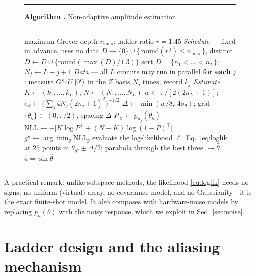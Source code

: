 \documentclass[%
 twocolumn,
 amsmath,amssymb,
prx,
longbibliography
]{revtex4-2}
\newcounter{algcnt}
\begin{document}
\begin{figure}[t]
\label{alg:method}
\vspace{2pt}\hrule\vspace{3pt}
\noindent\textbf{Algorithm \thealgcnt.} Non-adaptive amplitude estimation.
\vspace{3pt}\hrule\vspace{4pt}
\begin{algorithmic}[1]
\Require maximum Grover depth $n_{\max}$; ladder ratio $r = 1.45$
\Statex \hspace{-1.4em}\emph{Schedule} --- fixed in advance, uses no data
\State $D \gets \{0\} \cup \{\,\mathrm{round}(r^{\,j}) \le n_{\max}\,\}$, distinct
\State $D \gets D \cup \{\mathrm{round}(\max(D)/1.3)\}$ 
\State sort $D = \{n_1 < \dots < n_L\}$; \; $N_j \gets L-j+1$
\Statex \hspace{-1.4em}\emph{Data} --- all $L$ circuits may run in parallel
\State \textbf{for each} $j$: measure $G^{n_j}U\ket{0^l}$ in the $Z$ basis $N_j$ times, record $k_j$
\Statex \hspace{-1.4em}\emph{Estimate}
\State $K \gets (k_1, \dots, k_L)$;\; $N \gets (N_1, \dots, N_L)$ 
\State $w \gets \pi/[2(2n_L{+}1)]$;\; $\sigma_\theta \gets \big(\textstyle\sum_j 4N_j(2n_j{+}1)^2\big)^{-1/2}$
\State $\Delta \gets \min(w/8,\ 4\sigma_\theta)$;\; grid $\{\theta_g\} \subset (0,\pi/2)$, spacing $\Delta$
\State $P_{gj} \gets p_{n_j}(\theta_g)$
\State $\mathrm{NLL} \gets -\big[K\log P^{\!\top} + (N{-}K)\log(1{-}P)^{\!\top}\big]$ 
\State $g^\star \gets \arg\min_g \mathrm{NLL}_g$
\State evaluate the log-likelihood $\ell$ [Eq.~\eqref{eq:loglik}] at $25$ points in $\theta_{g^\star}\pm\Delta/2$; parabola through the best three $\to\hat\theta$
\Ensure $\hat a = \sin\hat\theta$
\end{algorithmic}
\vspace{3pt}\hrule\vspace{2pt}
\end{figure}

A practical remark: unlike subspace methods, the likelihood \eqref{eq:loglik} needs no signs, no uniform (virtual) array, no covariance model, and no Gaussianity---it is the exact finite-shot model. It also composes with hardware-noise models by replacing $p_{n}(\theta)$ with the noisy response, which we exploit in Sec.~\ref{sec:noise}.

\section{Ladder design and the aliasing mechanism}\label{sec:ladder}
\end{document}
